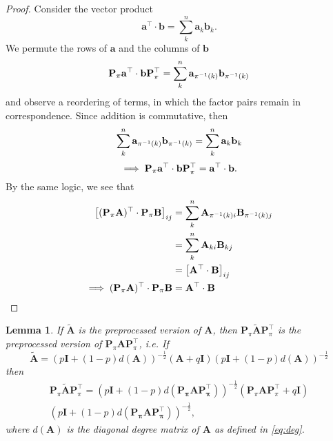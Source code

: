 \documentclass{article}
\newtheorem{lemma}[theorem]{Lemma}
\renewcommand{\vec}[1]{\mathbf{#1}}
\renewcommand{\o}{\cdot}
\renewcommand{\P}{\mathbf{P}}
\newcommand{\T}{\top}
\theoremstyle{definition}
\begin{document}
\begin{proof}
    Consider the vector product
    \begin{equation}
    \mathbf{a}^\T \cdot \mathbf{b} = \sum_k^n \vec{a}_k \vec{b}_k.
  \end{equation}
    We permute the rows of $\vec{a}$ and the columns of $\vec{b}$
    \begin{equation}
    \P_\pi \vec{a}^\T \cdot \vec{b} \P_\pi^\T = \sum_k^n \vec{a}_\pin{k} \vec{b}_\pin{k} \\
  \end{equation}
   and observe a reordering of terms, in which the factor pairs remain in correspondence. Since addition is commutative, then
    \begin{equation}
    \sum_k^n \vec{a}_\pin{k} \vec{b}_\pin{k} = \sum_k^n \vec{a}_k \vec{b}_k \\
  \end{equation}
    \begin{equation}
    \implies \P_\pi \vec{a}^\T \cdot \vec{b} \P_\pi^\T = \vec{a}^\T \cdot \vec{b}. \\
  \end{equation}
  By the same logic, we see that
  \begin{align}
    \left[ (\P_\pi \vec{A})^\top \o \P_\pi \vec{B} \right]_{ij} &= \sum_k^n \vec{A}_{\pin{k}i} \vec{B}_{\pin{k}j} \\
    &= \sum_k^n \vec{A}_{ki} \vec{B}_{kj} \\
    &= \left[ \vec{A}^\top \o \vec{B} \right]_{ij} \\
    \implies (\P_\pi \vec{A})^\top \o \P_\pi \vec{B} &= \vec{A}^\top \o \vec{B}
  \end{align}
\end{proof}

\begin{lemma}
  \label{lma:pre}
  If $\vec{\tilde{A}}$ is the preprocessed version of $\vec{A}$, then $\P_\pi \vec{\tilde{A}} \P_\pi^\T$ is the preprocessed version of $\P_\pi \vec{A} \P_\pi^\T$, i.e. If
  \begin{equation}
    \vec{\tilde{A}} = (p \vec{I} + (1 - p) d(\vec{A}))^{-\frac{1}{2}} (\vec{A} + q \vec{I}) (p \vec{I} + (1 - p) d(\vec{A}))^{-\frac{1}{2}}
  \end{equation}
    then
  \begin{multline}
  \P_\pi \vec{\tilde{A}} \P_\pi^\T = (p \vec{I} + (1 - p) d(\vec{\P_\pi \vec{A} \P_\pi^\T}))^{-\frac{1}{2}} (\P_\pi \vec{A} \P_\pi^\T + q \vec{I}) \\ (p \vec{I} + (1 - p) d(\vec{\P_\pi \vec{A} \P_\pi^\T}))^{-\frac{1}{2}},
  \label{eq:pap}
  \end{multline}
  where $d(\vec{A})$ is the diagonal degree matrix of $\vec{A}$ as defined in \autoref{eq:deg}.
\end{lemma}
\end{document}
